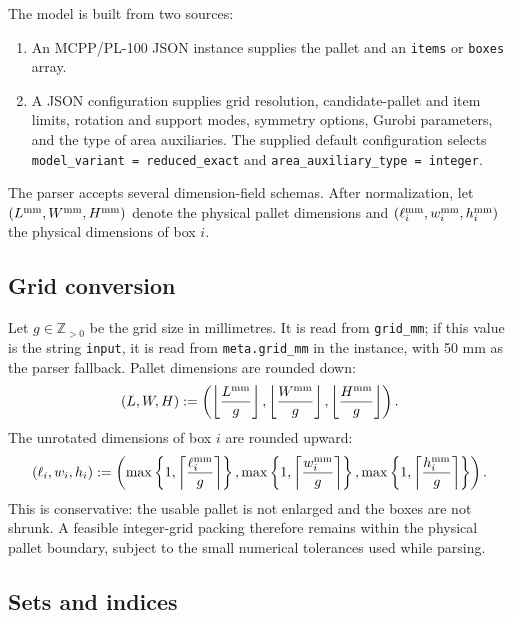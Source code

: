\documentclass[11pt]{article}
\newcommand{\Z}{\mathbb Z}
\begin{document}
The model is built from two sources:
\begin{enumerate}[leftmargin=*]
 \item An MCPP/PL-100 JSON instance supplies the pallet and an \texttt{items}
 or \texttt{boxes} array.
 \item A JSON configuration supplies grid resolution, candidate-pallet and
 item limits, rotation and support modes, symmetry options, Gurobi parameters,
 and the type of area auxiliaries.  The supplied default configuration selects
 \texttt{model\_variant = reduced\_exact} and
 \texttt{area\_auxiliary\_type = integer}.
\end{enumerate}

The parser accepts several dimension-field schemas.  After normalization, let
$(L^{\rm mm},W^{\rm mm},H^{\rm mm})$ denote the physical pallet dimensions and
$(\ell_i^{\rm mm},w_i^{\rm mm},h_i^{\rm mm})$ the physical dimensions of box
$i$.

\subsection{Grid conversion}

Let $g\in\Z_{>0}$ be the grid size in millimetres.  It is read from
\texttt{grid\_mm}; if this value is the string \texttt{input}, it is read from
\texttt{meta.grid\_mm} in the instance, with 50 mm as the parser fallback.
Pallet dimensions are rounded down:
\begin{equation}
 (L,W,H):=\left(
 \left\lfloor\frac{L^{\rm mm}}g\right\rfloor,
 \left\lfloor\frac{W^{\rm mm}}g\right\rfloor,
 \left\lfloor\frac{H^{\rm mm}}g\right\rfloor\right).
 \label{eq:pallet-grid}
\end{equation}
The unrotated dimensions of box $i$ are rounded upward:
\begin{equation}
 (\ell_i,w_i,h_i):=\left(
 \max\left\{1,\left\lceil\frac{\ell_i^{\rm mm}}g\right\rceil\right\},
 \max\left\{1,\left\lceil\frac{w_i^{\rm mm}}g\right\rceil\right\},
 \max\left\{1,\left\lceil\frac{h_i^{\rm mm}}g\right\rceil\right\}\right).
 \label{eq:box-grid}
\end{equation}
This is conservative: the usable pallet is not enlarged and the boxes are not
shrunk.  A feasible integer-grid packing therefore remains within the physical
pallet boundary, subject to the small numerical tolerances used while parsing.

\subsection{Sets and indices}
\end{document}
